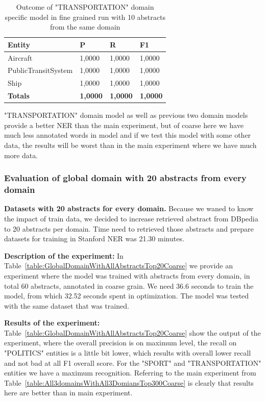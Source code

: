 \documentclass[thesis=M,english]{FITthesis}[2018/05/30]
\begin{document}
	\begin{table}[H]\centering
		\begin{tabular}{|l|l|l|l|}
			\hline {\textbf{Entity}} & {\textbf{P}} & {\textbf{R}} & {\textbf{F1}}\\\hline
				Aircraft & 1,0000 & 1,0000 & 1,0000\\
				PublicTransitSystem & 1,0000 & 1,0000 & 1,0000\\
				Ship & 1,0000 & 1,0000 & 1,0000\\\hline
				\textbf{Totals} & \textbf{1,0000} & \textbf{1,0000} & \textbf{1,0000}\\\hline
		\end{tabular}
		\caption{Outcome of "TRANSPORTATION" domain specific model in fine grained run with 10 abstracts from the same domain \label{table:TransportationDomainWithTransportationTop10Fine}}
	\end{table}

	"TRANSPORTATION" domain model as well as previous two domain models provide a better NER than the main experiment, but of coarse here we have much less annotated words in model and if we test this model with some other data, the results will be worst than in the main experiment where we have much more data.
	
\subsubsection{Evaluation of global domain with 20 abstracts from every domain }
\textbf{Datasets with 20 abstracts for every domain.} Because we waned to know the impact of train data, we decided to increase retrieved abstract from DBpedia to 20 abstracts per domain. Time need to retrieved those abstracts and prepare datasets for training in Stanford NER was 21.30 minutes.

\textbf{Description of the experiment:} In Table~\ref{table:GlobalDomainWithAllAbstractsTop20Coarse} we provide an experiment where the model was trained with abstracts from every domain, in total 60 abstracts, annotated in coarse grain. We need 36.6 seconds to train the model, from which 32.52 seconds spent in optimization. The model was tested with the same dataset that was trained.    

\textbf{Results of the experiment:} Table~\ref{table:GlobalDomainWithAllAbstractsTop20Coarse} show the output of the experiment, where the overall precision is on maximum level, the recall on "POLITICS" entities is a little bit lower, which results with overall lower recall and not bad at all F1 overall score. For the "SPORT" and "TRANSPORTATION" entities we have a maximum recognition. Referring to the main experiment from Table~\ref{table:All3domainsWithAll3DomiansTop300Coarse} is clearly that results here are better than in main experiment.
\end{document}
